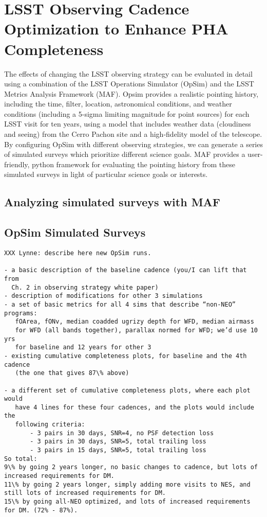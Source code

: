 \section{LSST Observing Cadence Optimization to Enhance PHA Completeness \label{sec:opsim}}

The effects of changing the LSST observing strategy can be evaluated in detail using a combination of the LSST Operations Simulator (OpSim) and the LSST Metrics Analysis Framework (MAF). Opsim provides a realistic pointing history, including the time, filter, location, astronomical conditions, and weather conditions (including a 5-sigma limiting magnitude for point sources) for each LSST visit for ten years, using a model that includes weather data (cloudiness and seeing) from the Cerro Pachon site and a high-fidelity model of the telescope. By configuring OpSim with different observing strategies, we can generate a series of simulated surveys which prioritize different science goals. MAF provides a user-friendly, python framework for evaluating the pointing history from these simulated surveys in light of particular science goals or interests.

\subsection{Analyzing simulated surveys with MAF}



\subsection{OpSim Simulated Surveys}



\begin{verbatim}
XXX Lynne: describe here new OpSim runs.  

- a basic description of the baseline cadence (you/I can lift that from 
  Ch. 2 in observing strategy white paper) 
- description of modifications for other 3 simulations 
- a set of basic metrics for all 4 sims that describe “non-NEO” programs: 
   fOArea, fONv, median coadded ugrizy depth for WFD, median airmass 
   for WFD (all bands together), parallax normed for WFD; we’d use 10 yrs
   for baseline and 12 years for other 3 
- existing cumulative completeness plots, for baseline and the 4th cadence
   (the one that gives 87\% above)
        
- a different set of cumulative completeness plots, where each plot would 
   have 4 lines for these four cadences, and the plots would include the
   following criteria:
       - 3 pairs in 30 days, SNR=4, no PSF detection loss
       - 3 pairs in 30 days, SNR=5, total trailing loss
       - 3 pairs in 15 days, SNR=5, total trailing loss
So total: 
9\% by going 2 years longer, no basic changes to cadence, but lots of increased requirements for DM. 
11\% by going 2 years longer, simply adding more visits to NES, and still lots of increased requirements for DM. 
15\% by going all-NEO optimized, and lots of increased requirements for DM. (72% - 87%).
\end{verbatim}



